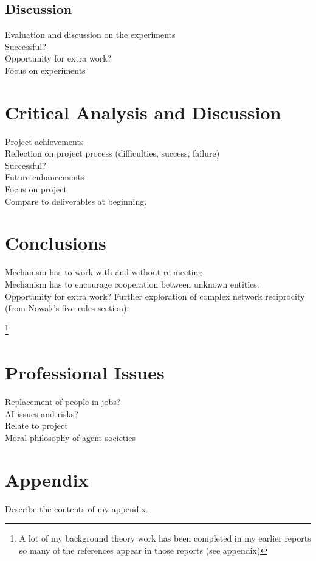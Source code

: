 \documentclass[]{final_report}
\begin{document}
\section{Discussion}
Evaluation and discussion on the experiments\\
Successful?\\
Opportunity for extra work?\\
Focus on experiments

\chapter{Critical Analysis and Discussion}
Project achievements\\
Reflection on project process (difficulties, success, failure)\\
Successful?\\
Future enhancements\\
Focus on project\\
Compare to deliverables at beginning.

\chapter{Conclusions}
Mechanism has to work with and without re-meeting.\\
Mechanism has to encourage cooperation between unknown entities.\\
Opportunity for extra work? Further exploration of complex network reciprocity (from Nowak's five rules section).\\


\newpage
{}

\footnote{A lot of my background theory work has been completed in my earlier reports so many of the references appear in those reports (see appendix)}
\label{endpage}

\chapter{Professional Issues}
Replacement of people in jobs?\\
AI issues and risks?\\
Relate to project\\
Moral philosophy of agent societies

\chapter{Appendix}
\label{appendix}
Describe the contents of my appendix.

%

%

%

%	
	
\end{document}
